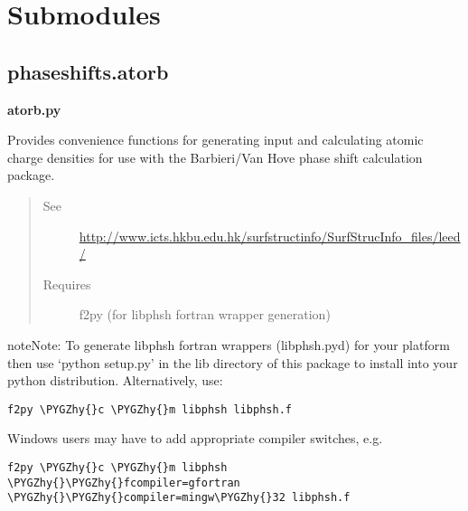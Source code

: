 \documentclass[letterpaper,10pt,english]{sphinxmanual}
\def\PYGZhy{\char`\-}
\begin{document}
\section{Submodules}
\label{modules:submodules}

\subsection{phaseshifts.atorb}
\label{modules:module-phaseshifts.atorb}\label{modules:phaseshifts-atorb}
\textbf{atorb.py}

Provides convenience functions for generating input and calculating 
atomic charge densities for use with the Barbieri/Van Hove phase 
shift calculation package.
\begin{quote}\begin{description}
\item[{See}] \leavevmode
\href{http://www.icts.hkbu.edu.hk/surfstructinfo/SurfStrucInfo\_files/leed/}{http://www.icts.hkbu.edu.hk/surfstructinfo/SurfStrucInfo\_files/leed/}

\item[{Requires}] \leavevmode
f2py (for libphsh fortran wrapper generation)

\end{description}\end{quote}

\begin{notice}{note}{Note:}
To generate libphsh fortran wrappers (libphsh.pyd) for your platform
then use `python setup.py' in the lib directory of this package to 
install into your python distribution. Alternatively, use:

\begin{Verbatim}[commandchars=\\\{\}]
f2py \PYGZhy{}c \PYGZhy{}m libphsh libphsh.f
\end{Verbatim}

Windows users may have to add appropriate compiler switches, e.g.

\begin{Verbatim}[commandchars=\\\{\}]
f2py \PYGZhy{}c \PYGZhy{}m libphsh \PYGZhy{}\PYGZhy{}fcompiler=gfortran \PYGZhy{}\PYGZhy{}compiler=mingw\PYGZhy{}32 libphsh.f
\end{Verbatim}
\end{notice}
\end{document}
